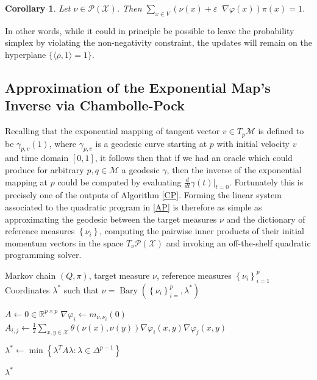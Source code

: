\documentclass{article}
\DeclareMathOperator*{\Bary}{Bary}
\newtheorem{corollary}{Corollary}
\newcommand{\R}{\mathbb{R}}
\newcommand{\M}{\mathcal{M}}
\newcommand{\X}{\mathcal{X}}
\DeclareMathOperator*{\divx}{div_{\X}}
\begin{document}
\begin{corollary}
Let \(\nu \in \mathcal{P}(\X)\). Then \(\sum\limits_{x\in V}(\nu(x) + \varepsilon\divx\nabla\varphi(x))\pi(x)=1\).
\end{corollary}

In other words, while it could in principle be possible to leave the probability simplex by violating the non-negativity constraint, the updates will remain on the hyperplane \(\{\langle\rho,1\rangle = 1\}\). 


\subsection{Approximation of the Exponential Map's Inverse via Chambolle-Pock}
Recalling that the exponential mapping of tangent vector \(v \in T_p\M\) is defined to be \(\gamma_{p,v}(1)\), where \(\gamma_{p,v}\) is a geodesic curve starting at \(p\) with initial velocity \(v\) and time domain \([0,1]\), it follows then that if we had an oracle which could produce for arbitrary \(p,q\in\M\) a geodesic \(\gamma\), then the inverse of the exponential mapping at \(p\) could be computed by evaluating \(\frac{d}{dt}\gamma(t)|_{t=0}\). Fortunately this is precisely one of the outputs of Algorithm \eqref{CP}. Forming the linear system associated to the quadratic program in \eqref{AP} is therefore as simple as approximating the geodesic between the target measures \(\nu\) and the dictionary of reference measures \(\left\{ \nu_i \right\}\), computing the pairwise inner products of their initial momentum vectors in the space \(T_\nu \mathcal{P}(\X)\) and invoking an off-the-shelf quadratic programming solver.

\begin{algorithm}
  \caption{Analysis of Barycenters via Quadratic Programming}
  \label{Alg2}
  \begin{algorithmic}
    \Require Markov chain \((Q,\pi)\), target measure \(\nu\), reference measures \(\left\{ \nu_i \right\}_{i=1}^p\)
    \Ensure Coordinates \(\lambda^*\) such that \(\nu = \Bary(\left\{ \nu_i \right\}_{i=}^p, \lambda^*)\)

    \State \(A \gets 0 \in \R^{p\times p}\)
      \State \(\nabla\varphi_i \gets m_{\nu,\nu_i}(0)\) 
    \EndFor
      \State \(A_{i,j} \gets \frac{1}{2}\sum\limits_{x,y\in \X}\theta(\nu(x), \nu(y))\nabla\varphi_i(x,y)\nabla\varphi_j(x,y)\) 
    \EndFor

    \State \(\lambda^*\gets \min\left\{ \lambda^TA\lambda : \lambda \in \Delta^{p-1} \right\}\) 

    \State \Return \(\lambda^*\)
	
  \end{algorithmic}
  
\end{algorithm}
\end{document}
